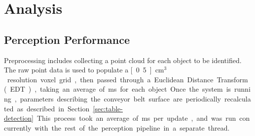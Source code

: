 \documentclass[letterpaper, 10 pt, conference]{ieeeconf}  %
\begin{document}
\section{Analysis}
\subsection{Perception Performance}
Preprocessing includes collecting a point cloud for each object to be
identified. The raw point data is used to populate a \unit[0.5]{cm$^3$}
resolution voxel grid, then passed through a Euclidean Distance
Transform (EDT), taking an average of \unit[304]{ms} for each object.


Once the system is running, parameters describing the conveyor belt
surface are periodically recalculated as described in
Section~\ref{sec:table-detection}. This process took an average of
\unit[39]{ms} per update, and was run concurrently with the rest of
the perception pipeline in a separate thread.

\end{document}
